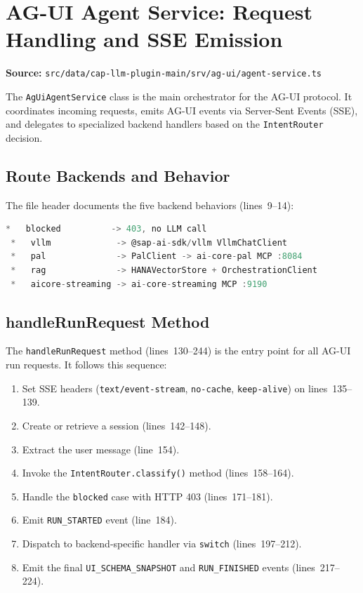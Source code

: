 \documentclass[11pt]{article}
\begin{document}
\section{AG-UI Agent Service: Request Handling and SSE Emission}
\label{sec:agent-service}

\noindent\textbf{Source:}
\texttt{src/data/cap-llm-plugin-main/srv/ag-ui/agent-service.ts}

The \texttt{AgUiAgentService} class is the main orchestrator for the AG-UI
protocol. It coordinates incoming requests, emits AG-UI events via
Server-Sent Events (SSE), and delegates to specialized backend handlers based
on the \texttt{IntentRouter} decision.

\subsection{Route Backends and Behavior}

The file header documents the five backend behaviors (lines~9--14):

\begin{lstlisting}[language=TypeScript,caption={Route backend documentation (agent-service.ts, lines 9--14)},firstnumber=9]
 *   blocked          -> 403, no LLM call
 *   vllm             -> @sap-ai-sdk/vllm VllmChatClient
 *   pal              -> PalClient -> ai-core-pal MCP :8084
 *   rag              -> HANAVectorStore + OrchestrationClient
 *   aicore-streaming -> ai-core-streaming MCP :9190
\end{lstlisting}

\subsection{handleRunRequest Method}

The \texttt{handleRunRequest} method (lines~130--244) is the entry point for
all AG-UI run requests. It follows this sequence:

\begin{enumerate}
  \item Set SSE headers (\texttt{text/event-stream}, \texttt{no-cache},
        \texttt{keep-alive}) on lines~135--139.
  \item Create or retrieve a session (lines~142--148).
  \item Extract the user message (line~154).
  \item Invoke the \texttt{IntentRouter.classify()} method (lines~158--164).
  \item Handle the \texttt{blocked} case with HTTP 403 (lines~171--181).
  \item Emit \texttt{RUN\_STARTED} event (line~184).
  \item Dispatch to backend-specific handler via \texttt{switch} (lines~197--212).
  \item Emit the final \texttt{UI\_SCHEMA\_SNAPSHOT} and \texttt{RUN\_FINISHED} events
        (lines~217--224).
\end{enumerate}
\end{document}
